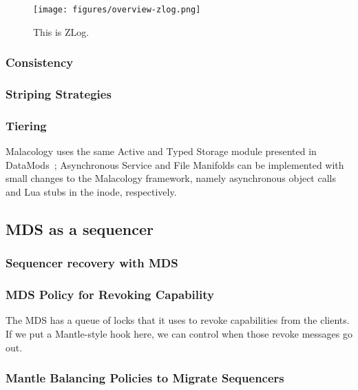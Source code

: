\documentclass[10pt,twocolumn]{article}
\begin{document}
\begin{figure}[htbp]
\centering
\texttt{[image: figures/overview-zlog.png]}
\caption{This is ZLog.}
\end{figure}

\subsubsection{Consistency}\label{consistency}

\subsubsection{Striping Strategies}\label{striping-strategies}

\subsubsection{Tiering}\label{tiering}

Malacology uses the same Active and Typed Storage module presented in
DataMods~\cite{watkins_datamods_2012}; Asynchronous Service and File
Manifolds can be implemented with small changes to the Malacology
framework, namely asynchronous object calls and Lua stubs in the inode,
respectively.

\subsection{MDS as a sequencer}\label{mds-as-a-sequencer}

\subsubsection{Sequencer recovery with
MDS}\label{sequencer-recovery-with-mds}

\subsubsection{MDS Policy for Revoking
Capability}\label{mds-policy-for-revoking-capability}

The MDS has a queue of locks that it uses to revoke capabilities from
the clients. If we put a Mantle-style hook here, we can control when
those revoke messages go out.

\subsubsection{Mantle Balancing Policies to Migrate
Sequencers}\label{mantle-balancing-policies-to-migrate-sequencers}
\end{document}
